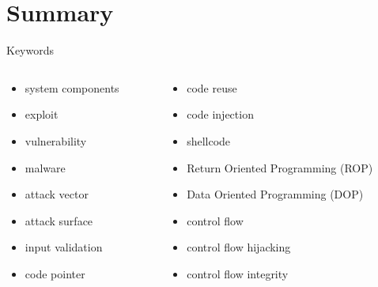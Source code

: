 \documentclass{curs}
\begin{document}
\section{Summary}

\begin{frame}{Keywords}
  \begin{columns}
    \begin{column}{0.5\textwidth}
      \begin{itemize}
        \item system components
        \item exploit
        \item vulnerability
        \item malware
        \item attack vector
        \item attack surface
        \item input validation
        \item code pointer
      \end{itemize}
    \end{column}
    \begin{column}{0.5\textwidth}
      \begin{itemize}
        \item code reuse
        \item code injection
        \item shellcode
        \item Return Oriented Programming (ROP)
        \item Data Oriented Programming (DOP)
        \item control flow
        \item control flow hijacking
        \item control flow integrity
      \end{itemize}
    \end{column}
  \end{columns}
\end{frame}

\end{document}

